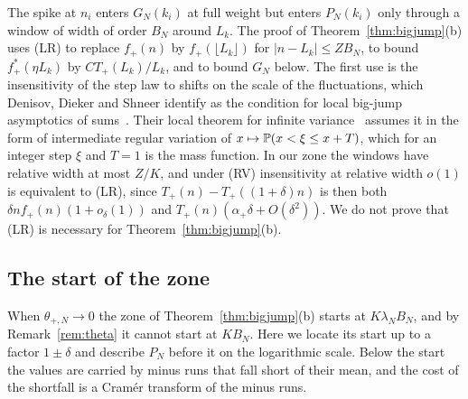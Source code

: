 \begin{remark}\label{rem:wr}
The spike at $n_i$ enters $G_N(k_i)$ at full weight but enters $P_N(k_i)$ only
through a window of width of order $B_N$ around $L_k$. The proof of
Theorem~\ref{thm:bigjump}(b) uses (LR) to replace $f_\plus(n)$ by
$f_\plus(\lfloor L_k\rfloor)$ for $|n-L_k|\le ZB_N$, to bound $f^*_\plus(\eta L_k)$ by
$CT_\plus(L_k)/L_k$, and to bound $G_N$ below. The first use is the insensitivity
of the step law to shifts on the scale of the fluctuations, which Denisov, Dieker
and Shneer identify as the condition for local big-jump asymptotics of
sums~\cite[Section~1 and condition~(6) of Corollary~2.1]{dds2008}. Their local
theorem for infinite variance~\cite[Theorem~9.1]{dds2008} assumes it in the form
of intermediate regular variation of $x\mapsto\mathbb{P}(x<\xi\le x+T)$, which for an
integer step $\xi$ and $T=1$ is the mass function. In our zone the windows
have relative width at most $Z/K$, and under (RV) insensitivity at relative width
$o(1)$ is equivalent to (LR), since $T_\plus(n)-T_\plus((1+\delta)n)$ is then both
$\delta nf_\plus(n)(1+o_\delta(1))$ and $T_\plus(n)(\alpha_\plus\delta+O(\delta^2))$.
We do not prove that (LR) is necessary for Theorem~\ref{thm:bigjump}(b).
\end{remark}

\subsection{The start of the zone}\label{sec:window}

When $\theta_{\plus,N}\to0$ the zone of Theorem~\ref{thm:bigjump}(b) starts at
$K\lambda_NB_N$, and by Remark~\ref{rem:theta} it cannot start at $KB_N$. Here we locate
its start up to a factor $1\pm\delta$ and describe $P_N$ before it on the logarithmic
scale. Below the start the values are carried by minus runs that fall short of their
mean, and the cost of the shortfall is a Cram\'er transform of the minus runs.

